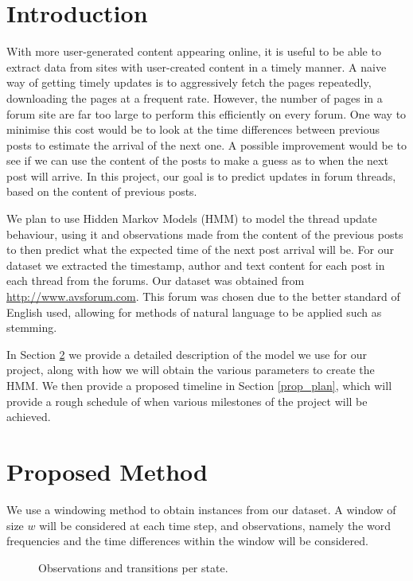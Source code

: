\documentclass[]{homework}
\begin{document}

\section{Introduction}
With more user-generated content appearing online, it is useful to be able to
extract data from sites with user-created content in a timely manner. A naive
way of getting timely updates is to aggressively fetch the pages repeatedly,
downloading the pages at a frequent rate. However, the number of pages in a
forum site are far too large to perform this efficiently on every forum. One
way to minimise this cost would be to look at the time differences between
previous posts to estimate the arrival of the next one. A possible improvement
would be to see if we can use the content of the posts to make a guess as to
when the next post will arrive. In this project, our goal is to predict updates
in forum threads, based on the content of previous posts.

We plan to use Hidden Markov Models (HMM) to model the thread update behaviour, 
using it and observations made from the content of the previous posts to then 
predict what the expected time of the next post arrival will be. For our dataset 
we extracted the timestamp, author and text content for each post in each thread 
from the forums.  Our dataset was obtained from \url{http://www.avsforum.com}.  
This forum was chosen due to the better standard of English used, allowing for 
methods of natural language to be applied such as stemming.

In Section \ref{prop_method} we provide a detailed description of the model we 
use for our project, along with how we will obtain the various parameters to 
create the HMM. We then provide a proposed timeline in Section \ref{prop_plan}, 
which will provide a rough schedule of when various milestones of the project 
will be achieved.

\section{Proposed Method}\label{prop_method}

We use a windowing method to obtain instances from our dataset. A window of size 
$w$ will be considered at each time step, and observations, namely the word 
frequencies and the time differences within the window will be considered.

\begin{figure}[h]
	\begin{center}
		
	\end{center}
	\caption{Observations and transitions per state.}\label{per_state}
\end{figure}
\end{document}

